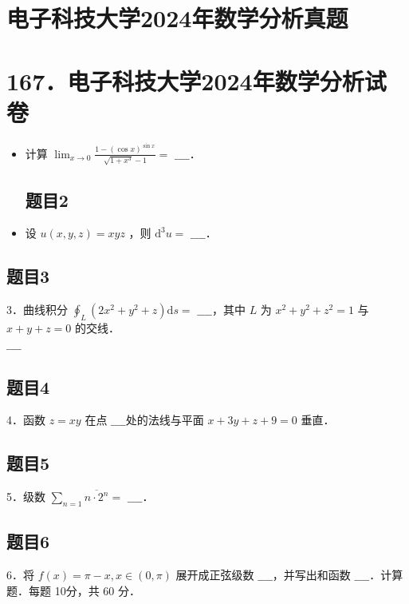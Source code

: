 \documentclass{article}
\begin{document}
\section*{电子科技大学2024年数学分析真题}
\section*{167．电子科技大学2024年数学分析试卷}
\begin{itemize}

\subsection{题目1}
  \item[1．] 计算 \(\lim _{x \rightarrow 0} \frac{1-(\cos x)^{\sin x}}{\sqrt{1+x^{3}}-1}=\) \(\_\_\_\_\)．

\subsection{题目2}
  \item[2．] 设 \(u(x, y, z)=x y z\) ，则 \(\mathrm{d}^{3} u=\) \(\_\_\_\_\)．
\end{itemize}

\subsection{题目3}
3．曲线积分 \(\oint_{L}\left(2 x^{2}+y^{2}+z\right) \mathrm{d} s=\) \(\_\_\_\_\)，其中 \(L\) 为 \(x^{2}+y^{2}+z^{2}=1\) 与 \(x+y+z=0\) 的交线．\\
\(\_\_\_\_\)

\subsection{题目4}
4．函数 \(z=x y\) 在点 \(\_\_\_\_\)处的法线与平面 \(x+3 y+z+9=0\) 垂直．

\subsection{题目5}
5．级数 \(\sum_{n=1} \overline{n \cdot 2^{n}}=\) \(\_\_\_\_\)．

\subsection{题目6}
6．将 \(f(x)=\pi-x, x \in(0, \pi)\) 展开成正弦级数 \(\_\_\_\_\)，并写出和函数 \(\_\_\_\_\)．计算题．每题 10分，共 60 分．
\end{document}

